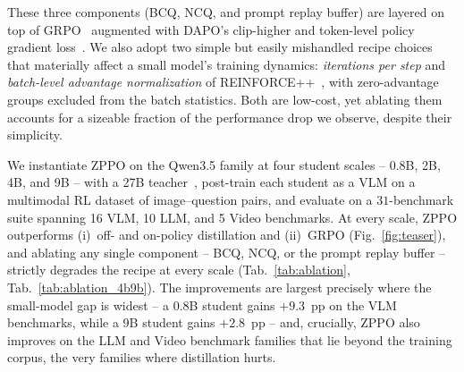 \documentclass{llmxive}
\begin{document}
These three components (BCQ, NCQ, and prompt replay buffer) are layered on top of GRPO~\citep{shao2024deepseekmath} augmented with DAPO's clip-higher and token-level policy gradient loss~\citep{yu2025dapo}. We also adopt two simple but easily mishandled recipe choices that materially affect a small model's training dynamics: \emph{iterations per step} and \emph{batch-level advantage normalization} of REINFORCE++~\citep{hu2025reinforce++}, with zero-advantage groups excluded from the batch statistics. Both are low-cost, yet ablating them accounts for a sizeable fraction of the performance drop we observe, despite their simplicity.

We instantiate ZPPO on the Qwen3.5 family at four student scales -- 0.8B, 2B, 4B, and 9B -- with a 27B teacher~\citep{qwen3.5}, post-train each student as a VLM on a multimodal RL dataset of image--question pairs, and evaluate on a $31$-benchmark suite spanning 16 VLM, 10 LLM, and 5 Video benchmarks. At every scale, ZPPO outperforms (i)~off- and on-policy distillation and (ii)~GRPO (Fig.~\ref{fig:teaser}), and ablating any single component -- BCQ, NCQ, or the prompt replay buffer -- strictly degrades the recipe at every scale (Tab.~\ref{tab:ablation}, Tab.~\ref{tab:ablation_4b9b}). The improvements are largest precisely where the small-model gap is widest -- a 0.8B student gains $+9.3$~pp on the VLM benchmarks, while a 9B student gains $+2.8$~pp -- and, crucially, ZPPO also improves on the LLM and Video benchmark families that lie beyond the training corpus, the very families where distillation hurts.
\end{document}
